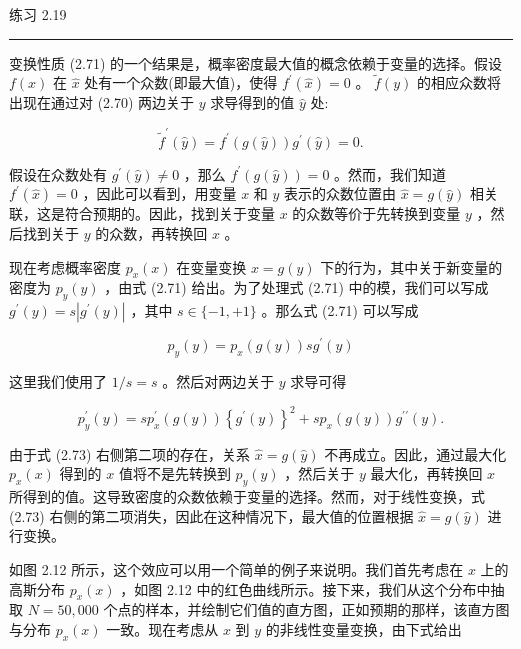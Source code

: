 \documentclass[10pt]{article}
\newcommand{\HRule}{\begin{center}\rule{0.9\linewidth}{0.2mm}\end{center}}
\begin{document}
练习 2.19

\HRule

变换性质 (2.71) 的一个结果是，概率密度最大值的概念依赖于变量的选择。假设 \(f\left( x\right)\) 在 \(\widehat{x}\) 处有一个众数(即最大值)，使得 \({f}^{\prime }\left( \widehat{x}\right)  = 0\) 。 \(\widetilde{f}\left( y\right)\) 的相应众数将出现在通过对 (2.70) 两边关于 \(y\) 求导得到的值 \(\widehat{y}\) 处:

\[
{\widetilde{f}}^{\prime }\left( \widehat{y}\right)  = {f}^{\prime }\left( {g\left( \widehat{y}\right) }\right) {g}^{\prime }\left( \widehat{y}\right)  = 0. \tag{2.72}
\]

假设在众数处有 \({g}^{\prime }\left( \widehat{y}\right)  \neq  0\) ，那么 \({f}^{\prime }\left( {g\left( \widehat{y}\right) }\right)  = 0\) 。然而，我们知道 \({f}^{\prime }\left( \widehat{x}\right)  = 0\) ，因此可以看到，用变量 \(x\) 和 \(y\) 表示的众数位置由 \(\widehat{x} = g\left( \widehat{y}\right)\) 相关联，这是符合预期的。因此，找到关于变量 \(x\) 的众数等价于先转换到变量 \(y\) ，然后找到关于 \(y\) 的众数，再转换回 \(x\) 。

现在考虑概率密度 \({p}_{x}\left( x\right)\) 在变量变换 \(x = g\left( y\right)\) 下的行为，其中关于新变量的密度为 \({p}_{y}\left( y\right)\) ，由式 (2.71) 给出。为了处理式 (2.71) 中的模，我们可以写成 \({g}^{\prime }\left( y\right)  = s\left| {{g}^{\prime }\left( y\right) }\right|\) ，其中 \(s \in  \{  - 1, + 1\}\) 。那么式 (2.71) 可以写成

\[
{p}_{y}\left( y\right)  = {p}_{x}\left( {g\left( y\right) }\right) s{g}^{\prime }\left( y\right)
\]

这里我们使用了 \(1/s = s\) 。然后对两边关于 \(y\) 求导可得

\[
{p}_{y}^{\prime }\left( y\right)  = s{p}_{x}^{\prime }\left( {g\left( y\right) }\right) {\left\{  {g}^{\prime }\left( y\right) \right\}  }^{2} + s{p}_{x}\left( {g\left( y\right) }\right) {g}^{\prime \prime }\left( y\right) . \tag{2.73}
\]

由于式 (2.73) 右侧第二项的存在，关系 \(\widehat{x} = g\left( \widehat{y}\right)\) 不再成立。因此，通过最大化 \({p}_{x}\left( x\right)\) 得到的 \(x\) 值将不是先转换到 \({p}_{y}\left( y\right)\) ，然后关于 \(y\) 最大化，再转换回 \(x\) 所得到的值。这导致密度的众数依赖于变量的选择。然而，对于线性变换，式 (2.73) 右侧的第二项消失，因此在这种情况下，最大值的位置根据 \(\widehat{x} = g\left( \widehat{y}\right)\) 进行变换。

如图 2.12 所示，这个效应可以用一个简单的例子来说明。我们首先考虑在 \(x\) 上的高斯分布 \({p}_{x}\left( x\right)\) ，如图 2.12 中的红色曲线所示。接下来，我们从这个分布中抽取 \(N = {50},{000}\) 个点的样本，并绘制它们值的直方图，正如预期的那样，该直方图与分布 \({p}_{x}\left( x\right)\) 一致。现在考虑从 \(x\) 到 \(y\) 的非线性变量变换，由下式给出
\end{document}
